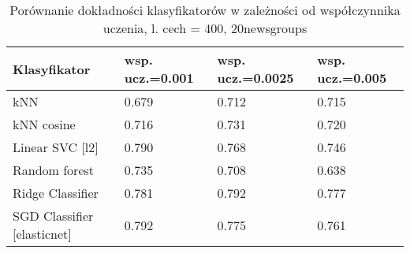 \documentclass{pracamgr}
\begin{document}
\begin{table}[]
\centering
{}
\caption{Porównanie dokładności klasyfikatorów w zależności od współczynnika uczenia, l. cech = 300, Reuters}
\label{learn_r_reuters}
\end{table}

\begin{table}[]
\centering
\begin{tabular}{@{}llll@{}}
\toprule
Klasyfikator                             & wsp. ucz.=0.001 & wsp. ucz.=0.0025 & wsp. ucz.=0.005 \\ \midrule
kNN                             & 0.679          & 0.712           & 0.715          \\
kNN cosine                      & 0.716          & 0.731           & 0.720          \\
Linear SVC {[}l2{]}             & 0.790          & 0.768           & 0.746          \\
Random forest                   & 0.735          & 0.708           & 0.638          \\
Ridge Classifier                & 0.781          & 0.792           & 0.777          \\
SGD Classifier {[}elasticnet{]} & 0.792          & 0.775           & 0.761          \\ \bottomrule
\end{tabular}
\caption{Porównanie dokładności klasyfikatorów w zależności od współczynnika uczenia, l. cech = 400, 20newsgroups}
\label{news_learn_r}
\end{table}
\end{document}
